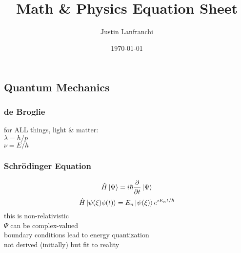 \documentclass[letterpaper,landscape,10pt]{article}
\title{Math \& Physics Equation Sheet}
\author{Justin Lanfranchi}
\date{\today}
\newif\iftechexplorer\techexplorerfalse
\begin{document}
{
\raggedright


\fontsize{6}{1}\selectfont %

\begin{multicols}{4}


\iftechexplorer
  \maketitle
\fi


\section*{Quantum Mechanics}
  \subsubsection*{de Broglie}
	\hspace{5pt}for ALL things, light \& matter: \\
	\hspace{15pt}$\lambda=h/p$ \\
	\hspace{15pt}$\nu=E/h$
  \subsubsection*{Schr\"odinger Equation}
	$$ \hat{H} \left| \Psi \right> = i\hbar\frac{\partial }{\partial t}\left| \Psi \right> $$
	$$ \hat{H} \left| \psi(\xi)\phi(t) \right> = E_n \left| \psi(\xi) \right> e^{iE_nt/\hbar} $$
	\hspace{5pt}this is non-relativistic\\
	\hspace{5pt}$\Psi$ can be complex-valued\\
	\hspace{5pt}boundary conditions lead to energy quantization\\
	\hspace{5pt}not derived (initially) but fit to reality\\

\end{multicols}}
\end{document}
